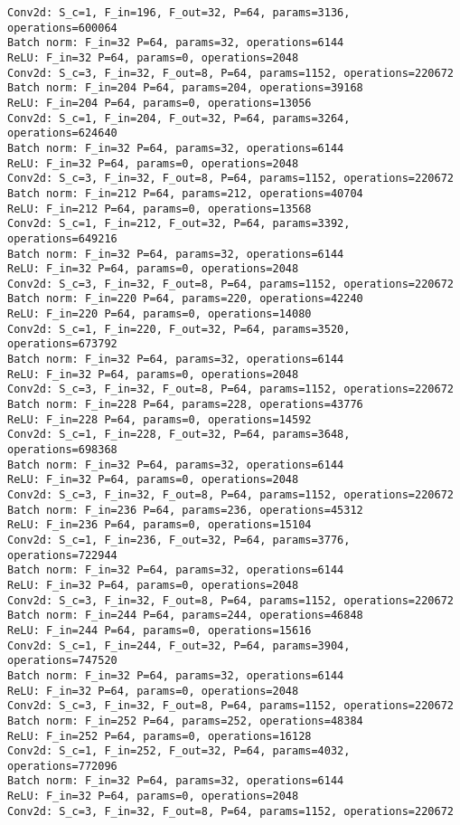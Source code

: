 \begin{Verbatim}[fontsize=\small]
Conv2d: S_c=1, F_in=196, F_out=32, P=64, params=3136, operations=600064
Batch norm: F_in=32 P=64, params=32, operations=6144
ReLU: F_in=32 P=64, params=0, operations=2048
Conv2d: S_c=3, F_in=32, F_out=8, P=64, params=1152, operations=220672
Batch norm: F_in=204 P=64, params=204, operations=39168
ReLU: F_in=204 P=64, params=0, operations=13056
Conv2d: S_c=1, F_in=204, F_out=32, P=64, params=3264, operations=624640
Batch norm: F_in=32 P=64, params=32, operations=6144
ReLU: F_in=32 P=64, params=0, operations=2048
Conv2d: S_c=3, F_in=32, F_out=8, P=64, params=1152, operations=220672
Batch norm: F_in=212 P=64, params=212, operations=40704
ReLU: F_in=212 P=64, params=0, operations=13568
Conv2d: S_c=1, F_in=212, F_out=32, P=64, params=3392, operations=649216
Batch norm: F_in=32 P=64, params=32, operations=6144
ReLU: F_in=32 P=64, params=0, operations=2048
Conv2d: S_c=3, F_in=32, F_out=8, P=64, params=1152, operations=220672
Batch norm: F_in=220 P=64, params=220, operations=42240
ReLU: F_in=220 P=64, params=0, operations=14080
Conv2d: S_c=1, F_in=220, F_out=32, P=64, params=3520, operations=673792
Batch norm: F_in=32 P=64, params=32, operations=6144
ReLU: F_in=32 P=64, params=0, operations=2048
Conv2d: S_c=3, F_in=32, F_out=8, P=64, params=1152, operations=220672
Batch norm: F_in=228 P=64, params=228, operations=43776
ReLU: F_in=228 P=64, params=0, operations=14592
Conv2d: S_c=1, F_in=228, F_out=32, P=64, params=3648, operations=698368
Batch norm: F_in=32 P=64, params=32, operations=6144
ReLU: F_in=32 P=64, params=0, operations=2048
Conv2d: S_c=3, F_in=32, F_out=8, P=64, params=1152, operations=220672
Batch norm: F_in=236 P=64, params=236, operations=45312
ReLU: F_in=236 P=64, params=0, operations=15104
Conv2d: S_c=1, F_in=236, F_out=32, P=64, params=3776, operations=722944
Batch norm: F_in=32 P=64, params=32, operations=6144
ReLU: F_in=32 P=64, params=0, operations=2048
Conv2d: S_c=3, F_in=32, F_out=8, P=64, params=1152, operations=220672
Batch norm: F_in=244 P=64, params=244, operations=46848
ReLU: F_in=244 P=64, params=0, operations=15616
Conv2d: S_c=1, F_in=244, F_out=32, P=64, params=3904, operations=747520
Batch norm: F_in=32 P=64, params=32, operations=6144
ReLU: F_in=32 P=64, params=0, operations=2048
Conv2d: S_c=3, F_in=32, F_out=8, P=64, params=1152, operations=220672
Batch norm: F_in=252 P=64, params=252, operations=48384
ReLU: F_in=252 P=64, params=0, operations=16128
Conv2d: S_c=1, F_in=252, F_out=32, P=64, params=4032, operations=772096
Batch norm: F_in=32 P=64, params=32, operations=6144
ReLU: F_in=32 P=64, params=0, operations=2048
Conv2d: S_c=3, F_in=32, F_out=8, P=64, params=1152, operations=220672

\end{Verbatim}
